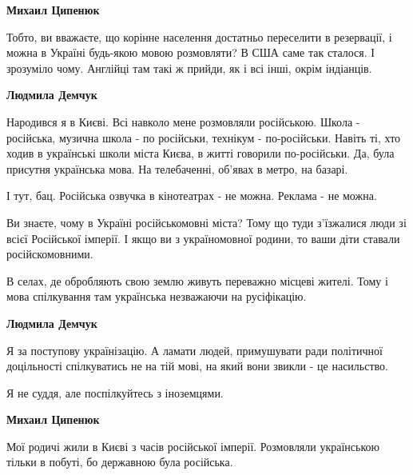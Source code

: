 \begin{itemize}
\begin{itemize}
\begin{itemize}
\textbf{Михаил Ципенюк} 

Тобто, ви вважаєте, що корінне населення достатньо переселити в резервації, і
можна в Україні будь-якою мовою розмовляти? В США саме так сталося. І зрозуміло
чому. Англійці там такі ж прийди, як і всі інші, окрім індіанців.

 
\textbf{Людмила Демчук} 

Народився я в Києві. Всі навколо мене розмовляли російською. Школа - російська,
музична школа - по російськи, технікум - по-російськи. Навіть ті, хто ходив в
українські школи міста Києва, в житті говорили по-російськи. Да, була присутня
українська мова. На телебаченні, об'явах в метро, на базарі.

І тут, бац. Російська озвучка в кінотеатрах - не можна. Реклама - не можна.

Ви знаєте, чому в Україні російськомовні міста? Тому що туди з'їзжалися люди зі
всієї Російської імперії. І якщо ви з україномовної родини, то ваши діти
ставали російскомовними.

В селах, де обробляють свою землю живуть переважно місцеві жителі. Тому і мова
спілкування там українська незважаючи на русіфікацію.

 
\textbf{Людмила Демчук} 

Я за поступову українізацію. А ламати людей, примушувати ради політичної
доцільності спілкуватись не на тій мові, на який вони звикли - це насильство.

Я не суддя, але поспілкуйтесь з іноземцями.


 
\textbf{Михаил Ципенюк} 

Мої родичі жили в Києві з часів російської імперії. Розмовляли українською
тільки в побуті, бо державною була російська.


\end{itemize}
\end{itemize}
\end{itemize}
